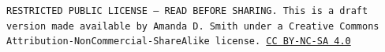 \documentclass[10pt]{article}
\begin{document}

\bigskip

\noindent
\texttt{\footnotesize RESTRICTED PUBLIC LICENSE --- READ BEFORE SHARING. This is a draft version made available by Amanda D. Smith under a Creative Commons Attribution-NonCommercial-ShareAlike license. 
\href{https://creativecommons.org/licenses/by-nc-sa/4.0/}{CC BY-NC-SA 4.0}}

\printbibliography
\end{document}
